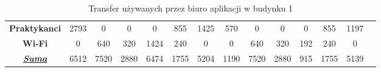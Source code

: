\documentclass[a4paper, 12pt]{article}
\begin{document}
\begin{itemize}
\begin{table}[H]
{\begin{tabular}{c|c|c|c|c|c|c|c|c|c|c|c|c|l}
\multicolumn{1}{|c|}{\textbf{Praktykanci}}         & 2793                  & 0                         & 0             & 0                   & 855                  & 1425                       & 570                   & 0                         & 0             & 0                   & 855                  & 1197                     &  \\ \cline{1-13}
\multicolumn{1}{|c|}{\textbf{Wi-Fi}}               & 0                     & 640                       & 320           & 1424                & 240                  & 0                          & 0                     & 640                       & 320           & 192                 & 240                  & 0                        &  \\ \cline{1-13}
\multicolumn{1}{|c|}{{\ul \textit{\textbf{Suma}}}} & 6512                  & 7520                      & 2880          & 6474                & 1755                 & 5204                       & 1190                  & 7520                      & 2880          & 915                 & 1755                 & 5139                     &  \\ \cline{1-13}
\end{tabular}}
\caption{Transfer używanych przez biuro aplikacji w budynku 1} 
\end{table}


\end{itemize}
\end{document}
